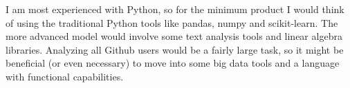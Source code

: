 \documentclass{article}
\begin{document}
I am most experienced with Python, so for the minimum product I would think of using the traditional Python tools like pandas, numpy and scikit-learn. 
The more advanced model would involve some text analysis tools and linear algebra libraries. 
Analyzing all Github users would be a fairly large task, so it might be beneficial (or even necessary) to move into some big data tools and a language with functional capabilities.
\end{document}
